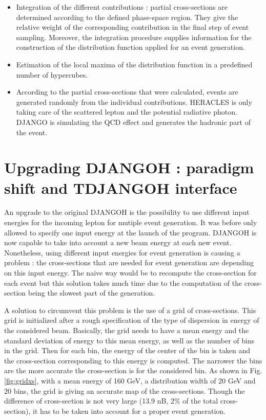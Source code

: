 \documentclass[letterpaper,12pt]{article}
\begin{document}
\begin{itemize}
\item Integration of the different contributions : partial cross-sections are determined
according to the defined phase-space region. They give the relative weight of the
corresponding contribution in the final step of event sampling. Moreover, the integration
procedure supplies information for the construction of the distribution function
applied for an event generation.
\item Estimation of the local maxima of the distribution function in a predefined number
of hypercubes.
\item According to the partial cross-sections that were calculated, events are generated
randomly from the individual contributions. HERACLES is only taking care of the scattered
lepton and the potential radiative photon. DJANGO is simulating the QCD effect and generates
the hadronic part of the event.
\end{itemize}

\section{Upgrading DJANGOH : paradigm shift and TDJANGOH interface}

An upgrade to the original DJANGOH is the possibility to use different input energies for
the incoming lepton for mutiple event generation. It was before only allowed to
specify one input energy at the launch of the program. DJANGOH is now capable to take
into account a new beam energy at each new event.
Nonetheless, using different input energies for event generation is causing a problem :
the cross-sections that are needed for event generation are depending on this input energy.
The naive way would be to recompute the cross-section for each event but this solution
takes much time due to the computation of the cross-section being the slowest part of
the generation.

A solution to circumvent this problem is the use
of a grid of cross-sections. This grid is initialized after a rough specification of the
type of dispersion in energy of the considered beam.
Basically, the grid needs to have
a mean energy and the standard deviation of energy to this mean energy, as well as the
number of bins in the grid. Then for each bin, the energy of the center of the bin is taken
and the cross-section corresponding to this energy is computed. The narrower the bins are
the more accurate the cross-section is for the considered bin. As shown in Fig. \ref{fig:gridxs}, with a
mean energy of 160 GeV, a distribution width of 20 GeV and 20 bins, the grid is giving an
accurate map of the cross-sections. Though the difference of cross-section is not very large (13.9 nB, 2\% of
the total cross-section), it has to be taken into account for a proper event generation.
\end{document}
